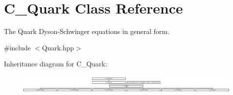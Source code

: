 \hypertarget{class_c___quark}{\section{C\-\_\-\-Quark Class Reference}
\label{class_c___quark}
}


The Quark Dyson-\/\-Schwinger equations in general form.  




{\ttfamily \#include $<$Quark.\-hpp$>$}

Inheritance diagram for C\-\_\-\-Quark\-:\begin{figure}[H]
\begin{center}
\leavevmode
\includegraphics[height=0.957265cm]{class_c___quark}
\end{center}
\end{figure}
